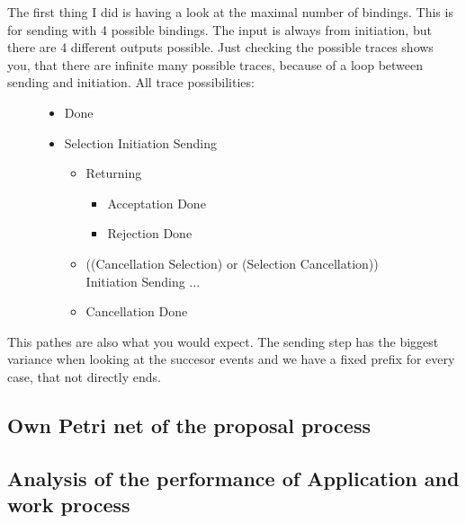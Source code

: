 The first thing I did is having a look at the maximal number of bindings. This is for sending with 4 possible bindings. The input is always from initiation, but there are 4 different outputs possible.  Just checking the possible traces shows you, that there are infinite many possible traces, because of a loop between sending and initiation. All trace possibilities:
\begin{figure}[!htbp]
\begin{itemize}
	\item Done
	\item Selection \textrightarrow Initiation \textrightarrow Sending \textrightarrow
	\begin{itemize}
	\item  Returning \textrightarrow
	\begin{itemize}
		\item Acceptation \textrightarrow Done
		\item Rejection \textrightarrow Done
	\end{itemize}
	\item ((Cancellation \textrightarrow Selection) or (Selection \textrightarrow Cancellation)) \textrightarrow Initiation \textrightarrow Sending ...
	\item Cancellation \textrightarrow Done
	\end{itemize}
\end{itemize}
\end{figure}

This pathes are also what you would expect. The sending step has the biggest variance when looking at the succesor events and we have a fixed prefix for every case, that not directly ends.


\subsection{Own Petri net of the proposal process}


\subsection{Analysis of the performance of Application and work process}

